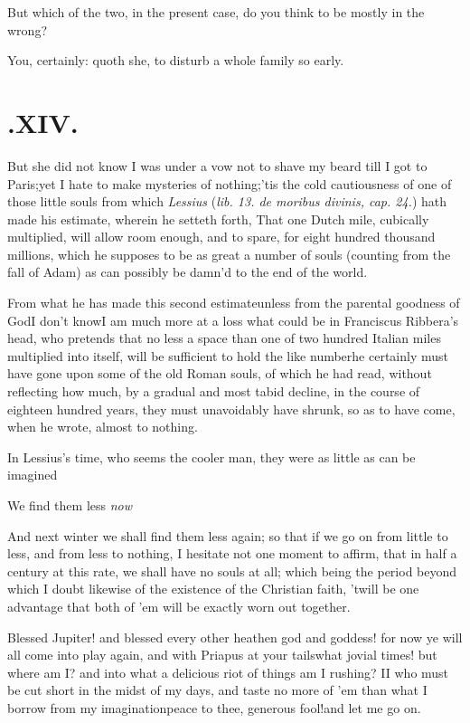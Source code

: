 \documentclass{article}
\begin{document}
\tsh But which of the two, in the present case, do you
think to be mostly in the wrong?

You, certainly\thinspace: quoth she, to disturb a whole family so
early.

\vfill{}\eject
\section{.\enspace XIV.}

\quad\tsh But she did not know I was under a vow not to
shave my beard till I got to Paris;\tsh yet I hate
to make mysteries of nothing;\tsh ’tis the cold
cautiousness of one of those little souls from which \textit{Lessius}
(\textit{lib. 13. de moribus divinis, cap. 24.}) hath made his estimate,
wherein he setteth forth, That one Dutch mile, cubically
multiplied, will allow room enough, and to spare, for eight hundred
thousand millions, which he supposes to be as great a number of
souls (counting from the fall of Adam) as can possibly be
damn’d to the end of the world.

From what he has made this second estimate\tsh unless
from the parental goodness of God\tsk I don’t know\tsk I
am much more at a loss what could be in Franciscus
Ribbera’s head, who pretends that no less a space than
one of two hundred Italian miles multiplied into itself,
will be sufficient to hold the like number\tsh he
certainly must have gone upon some of the old Roman souls,
of which he had read, without reflecting how much, by a gradual and
most tabid decline, in the course of eighteen hundred years, they
must unavoidably have shrunk, so as to have come, when he wrote,
almost to nothing.

In Lessius’s time, who seems the cooler man, they
were as little as can be imagined\tsh

\tsh We find them less \textit{now}\tsh

And next winter we shall find them less again; so that if we go
on from little to less, and from less to nothing, I hesitate not
one moment to affirm, that in half a century at this rate, we shall
have no souls at all; which being the period beyond which I doubt
likewise of the existence of the Christian faith, ’twill be
one advantage that both of ’em will be exactly worn out
together.\tsh

Blessed Jupiter! and blessed every other heathen god and goddess! for now ye will
all come into play again, and with Priapus at your tails\tsh\break what jovial times!\tsh
but where am I? and into what a delicious riot of things am I rushing? I\tsh I
who\break
must be cut short in the midst of my days, and taste no more of ’em than what I
borrow from my imagination\tsh peace to thee, generous fool!\break and let me go on.
\end{document}
